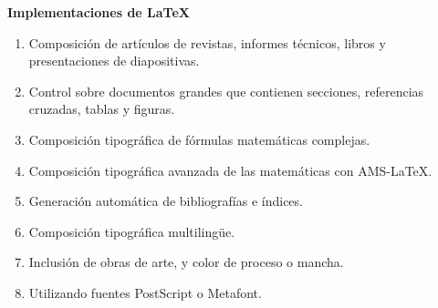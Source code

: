 \documentclass[letterpaper, 10pt, journal]{IEEEtran}
\begin{document}
\newline
\textbf{Implementaciones de \LaTeX}
\begin{enumerate}
    \item Composici\'on de art\'iculos de revistas, informes t\'ecnicos, libros y presentaciones de diapositivas.
    \item Control sobre documentos grandes que contienen secciones, referencias cruzadas, tablas y figuras.
    \item Composici\'on tipogr\'afica de f\'ormulas matem\'aticas complejas.
    \item Composici\'on tipogr\'afica avanzada de las matem\'aticas con AMS-LaTeX.
    \item Generaci\'on autom\'atica de bibliograf\'ias e \'indices.
    \item Composici\'on tipogr\'afica multiling\"ue.
    \item Inclusi\'on de obras de arte, y color de proceso o mancha.
    \item Utilizando fuentes PostScript o Metafont.
\end{enumerate}
\end{document}
